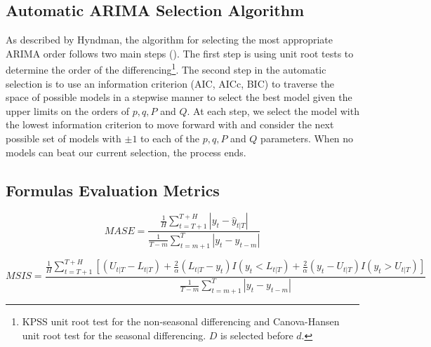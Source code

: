\documentclass[
]{article}
\begin{document}
\subsection*{Automatic ARIMA Selection Algorithm}
As described by Hyndman, the algorithm for selecting the most appropriate ARIMA order follows two main steps (\cite[p.~10-12]{hyndman_automatic_2008}). The first step is using unit root tests to determine the order of the differencing\footnote{KPSS unit root test for the non-seasonal differencing and Canova-Hansen unit root test for the seasonal differencing. $D$ is selected before $d$.}. The second step in the automatic selection is to use an information criterion (AIC, AICc, BIC) to traverse the space of possible models in a stepwise manner to select the best model given the upper limits on the orders of $p, q, P$ and $Q$. At each step, we select the model with the lowest information criterion to move forward with and consider the next possible set of models with $\pm 1$ to each of the $p, q, P$ and $Q$ parameters. When no models can beat our current selection, the process ends. 

\subsection*{Formulas Evaluation Metrics}

\[MASE = \frac{\frac{1}{H} \sum_{t = T + 1}^{T+H} |y_t - \hat{y}_{t|T}|}{\frac{1}{T-m}\sum_{t = m+1}^T |y_t - y_{t-m}|}\]

\[MSIS = \frac{\frac{1}{H}\sum_{t = T+1}^{T+H}\left[(U_{t|T} - L_{t|T}) + \frac{2}{\alpha}(L_{t|T} - y_t)I(y_t < L_{t|T}) + \frac{2}{\alpha}(y_t - U_{t|T})I(y_t > U_{t|T})\right]}{\frac{1}{T-m}\sum_{t = m+1}^T |y_t - y_{t-m}|}\]
\end{document}
